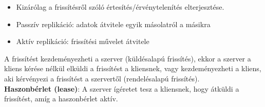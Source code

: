 \documentclass[margin=0px]{article}
\begin{document}
	\begin{itemize}
		\item	Kizárólag  a frissítésről szóló értesítés/érvénytelenítés elterjesztése.
		\item	Passzív replikáció: adatok átvitele egyik másolatról a másikra
		\item	Aktív replikáció: frissítési művelet átvitele
	\end{itemize}
	
	A frissítést kezdeményezheti a szerver (küldésalapú frissítés), ekkor a szerver a kliens kérése nélkül elküldi a frissítést
	a kliensnek, vagy kezdeményezheti a kliens, aki kérvényezi a frissítést a szervertől (rendelésalapú frissítés).\\
	
	\noindent \textbf{Haszonbérlet (lease)}: A szerver ígéretet tesz a kliensnek, hogy átküldi a frissítést, amíg a haszonbérlet aktív. 
	
\end{document}
